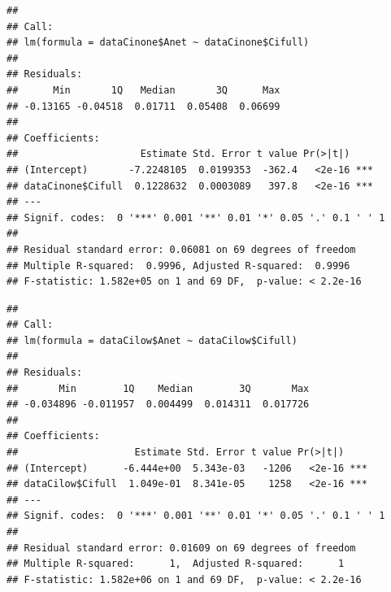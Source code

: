 \documentclass[
]{krantz}
\makeatletter
\newenvironment{Shaded}{\begin{snugshade}}{\end{snugshade}}
\newcommand{\DecValTok}[1]{\textcolor[rgb]{0.00,0.00,0.81}{#1}}
\newcommand{\FunctionTok}[1]{\textcolor[rgb]{0.00,0.00,0.00}{#1}}
\newcommand{\NormalTok}[1]{#1}
\newcommand{\OtherTok}[1]{\textcolor[rgb]{0.56,0.35,0.01}{#1}}
\newcommand{\SpecialCharTok}[1]{\textcolor[rgb]{0.00,0.00,0.00}{#1}}
\newenvironment{kframe}{%
\medskip{}
\setlength{\fboxsep}{.8em}
 \def\at@end@of@kframe{}%
 \ifinner\ifhmode%
  \def\at@end@of@kframe{\end{minipage}}%
  \begin{minipage}{\columnwidth}%
 \fi\fi%
 \def\FrameCommand##1{\hskip\@totalleftmargin \hskip-\fboxsep
 \colorbox{shadecolor}{##1}\hskip-\fboxsep
     \hskip-\linewidth \hskip-\@totalleftmargin \hskip\columnwidth}%
 \MakeFramed {\advance\hsize-\width
   \@totalleftmargin\z@ \linewidth\hsize
   \@setminipage}}%
 {\par\unskip\endMakeFramed%
 \at@end@of@kframe}
\renewenvironment{Shaded}{\begin{kframe}}{\end{kframe}}
\makeatother
\begin{document}
\begin{verbatim}
## 
## Call:
## lm(formula = dataCinone$Anet ~ dataCinone$Cifull)
## 
## Residuals:
##      Min       1Q   Median       3Q      Max 
## -0.13165 -0.04518  0.01711  0.05408  0.06699 
## 
## Coefficients:
##                     Estimate Std. Error t value Pr(>|t|)    
## (Intercept)       -7.2248105  0.0199353  -362.4   <2e-16 ***
## dataCinone$Cifull  0.1228632  0.0003089   397.8   <2e-16 ***
## ---
## Signif. codes:  0 '***' 0.001 '**' 0.01 '*' 0.05 '.' 0.1 ' ' 1
## 
## Residual standard error: 0.06081 on 69 degrees of freedom
## Multiple R-squared:  0.9996, Adjusted R-squared:  0.9996 
## F-statistic: 1.582e+05 on 1 and 69 DF,  p-value: < 2.2e-16
\end{verbatim}

\begin{Shaded}
\end{Shaded}

\begin{verbatim}
## 
## Call:
## lm(formula = dataCilow$Anet ~ dataCilow$Cifull)
## 
## Residuals:
##       Min        1Q    Median        3Q       Max 
## -0.034896 -0.011957  0.004499  0.014311  0.017726 
## 
## Coefficients:
##                    Estimate Std. Error t value Pr(>|t|)    
## (Intercept)      -6.444e+00  5.343e-03   -1206   <2e-16 ***
## dataCilow$Cifull  1.049e-01  8.341e-05    1258   <2e-16 ***
## ---
## Signif. codes:  0 '***' 0.001 '**' 0.01 '*' 0.05 '.' 0.1 ' ' 1
## 
## Residual standard error: 0.01609 on 69 degrees of freedom
## Multiple R-squared:      1,  Adjusted R-squared:      1 
## F-statistic: 1.582e+06 on 1 and 69 DF,  p-value: < 2.2e-16
\end{verbatim}

\begin{Shaded}
\end{Shaded}
\end{document}
